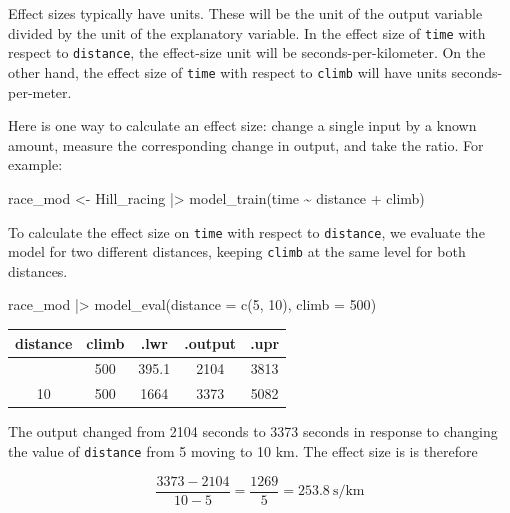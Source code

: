 \documentclass[
  letterpaper,
  DIV=11,
  numbers=noendperiod,
  oneside]{scrartcl}
\newenvironment{Shaded}{\begin{snugshade}}{\end{snugshade}}
\newcommand{\AttributeTok}[1]{\textcolor[rgb]{0.40,0.45,0.13}{#1}}
\newcommand{\DecValTok}[1]{\textcolor[rgb]{0.68,0.00,0.00}{#1}}
\newcommand{\FunctionTok}[1]{\textcolor[rgb]{0.28,0.35,0.67}{#1}}
\newcommand{\NormalTok}[1]{\textcolor[rgb]{0.00,0.23,0.31}{#1}}
\newcommand{\OtherTok}[1]{\textcolor[rgb]{0.00,0.23,0.31}{#1}}
\newcommand{\SpecialCharTok}[1]{\textcolor[rgb]{0.37,0.37,0.37}{#1}}
\begin{document}
Effect sizes typically have units. These will be the unit of the output
variable divided by the unit of the explanatory variable. In the effect
size of \texttt{time} with respect to \texttt{distance}, the effect-size
unit will be seconds-per-kilometer. On the other hand, the effect size
of \texttt{time} with respect to \texttt{climb} will have units
seconds-per-meter.

Here is one way to calculate an effect size: change a single input by a
known amount, measure the corresponding change in output, and take the
ratio. For example:

\begin{Shaded}
\begin{Highlighting}[]
\NormalTok{race\_mod }\OtherTok{\textless{}{-}}\NormalTok{ Hill\_racing }\SpecialCharTok{|\textgreater{}} \FunctionTok{model\_train}\NormalTok{(time }\SpecialCharTok{\textasciitilde{}}\NormalTok{ distance }\SpecialCharTok{+}\NormalTok{ climb)}
\end{Highlighting}
\end{Shaded}

To calculate the effect size on \texttt{time} with respect to
\texttt{distance}, we evaluate the model for two different distances,
keeping \texttt{climb} at the same level for both distances.

\begin{Shaded}
\begin{Highlighting}[]
\NormalTok{race\_mod }\SpecialCharTok{|\textgreater{}} \FunctionTok{model\_eval}\NormalTok{(}\AttributeTok{distance =} \FunctionTok{c}\NormalTok{(}\DecValTok{5}\NormalTok{, }\DecValTok{10}\NormalTok{), }\AttributeTok{climb =} \DecValTok{500}\NormalTok{)}
\end{Highlighting}
\end{Shaded}

\begin{longtable}[]{@{}ccccc@{}}
\toprule\noalign{}
distance & climb & .lwr & .output & .upr \\
\midrule\noalign{}
\endhead
\bottomrule\noalign{}
\endlastfoot
5 & 500 & 395.1 & 2104 & 3813 \\
10 & 500 & 1664 & 3373 & 5082 \\
\end{longtable}

The output changed from 2104 seconds to 3373 seconds in response to
changing the value of \texttt{distance} from 5 moving to 10 km. The
effect size is is therefore

\[\frac{3373 - 2104}{10 - 5} = \frac{1269}{5} = 253.8\ \text{s/km}\]
\end{document}
